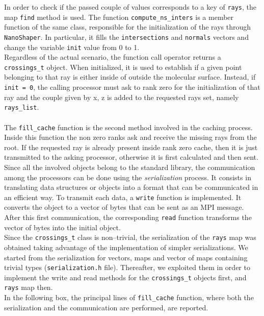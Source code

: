 \documentclass[11pt,a4paper]{article}
\begin{document}
In order to check if the passed couple of values corresponds to a key of \texttt{rays}, the map \texttt{find} method is used.   
The function \texttt{compute\_ns\_inters} is a member function of the same class, responsible for the initialization of the rays through \texttt{NanoShaper}. In particular, it fills the \texttt{intersections} and \texttt{normals} vectors and change the variable \texttt{init} value from 0 to 1. \\
Regardless of the actual scenario, the function call operator returns a \texttt{crossings\_t} object. When initialized, it is used to establish if a given point belonging to that ray is either inside of outside the molecular surface. Instead, if \texttt{init = 0}, the calling processor must ask to rank zero for the initialization of that ray and the couple given by {x, z} is added to the requested rays set, namely \texttt{rays\_list}. \\\\
The \texttt{fill\_cache} function is the second method involved in the caching process. Inside this function the non zero ranks ask and receive the missing rays from the root. If the requested ray is already present inside rank zero cache, then it is just transmitted to the asking processor, otherwise it is first calculated and then sent. Since all the involved objects belong to the standard library, the communication among the processors can be done using the \emph{serialization} process. It consists in translating data structures or objects into a format that can be communicated in an efficient way. To transmit each data, a \texttt{write} function is implemented. It converts the object
to a vector of bytes that can be sent as an MPI message. After this first communication, the corresponding \texttt{read} function transforms the vector of bytes into the initial object. \\
Since the \texttt{crossings\_t} class is non--trivial, the serialization of the \texttt{rays} map was obtained taking advantage of the implementation of simpler serializations. We started from the serialization for vectors, maps and vector of maps containing trivial types  (\texttt{serialization.h} file). Thereafter, we exploited them in order to implement the write and read methods for the \texttt{crossings\_t} objects first, and \texttt{rays} map then. \\
In the following box, the principal lines of \texttt{fill\_cache} function, where both the serialization and the communication are performed, are reported.
\end{document}
